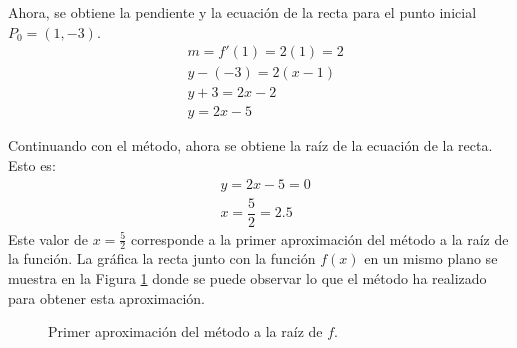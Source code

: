 \begin{exerciseT}
	Ahora, se obtiene la pendiente y la ecuación de la recta para el punto inicial $P_0 = (1, -3)$.
	\begin{align*}
		& m = f'(1) = 2(1) = 2 \\
		& y-(-3) = 2(x-1) \\
		& y+3=2x-2\\
		& y = 2x - 5
	\end{align*}
	
	Continuando con el método, ahora se obtiene la raíz de la ecuación de la recta. Esto es:
	\begin{align*}
		& y = 2x - 5 = 0 \\
		& x = \dfrac{5}{2} = 2.5
	\end{align*}
	Este valor de $x=\frac{5}{2}$ corresponde a la primer aproximación del método a la raíz de la función. 
	La gráfica la recta junto con la función $f(x)$ en un mismo plano se muestra en la Figura \ref{fig:NewtonRaphson02} 
	donde se puede observar lo que el método ha realizado para obtener esta aproximación.

	\begin{figure}[H]
		\centering
		\caption{Primer aproximación del método a la raíz de $f$.}
		\label{fig:NewtonRaphson02}
	\end{figure}


\end{exerciseT}
